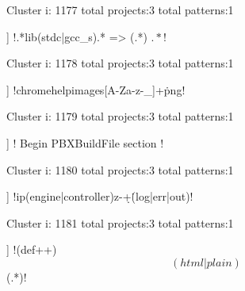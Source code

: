 Cluster i: 1177
total projects:3
total patterns:1
\begin{multicols}{1}
\begin{description}[noitemsep,topsep=0pt]
\item [[3] ] \cverb!.*lib(stdc\+\+|gcc_s).* => (.*) \(.*\)!
\end{description}
\end{multicols}







Cluster i: 1178
total projects:3
total patterns:1
\begin{multicols}{1}
\begin{description}[noitemsep,topsep=0pt]
\item [[3] ] \cverb!chrome\/help\/images\/[A-Za-z-_]+\.png!
\end{description}
\end{multicols}







Cluster i: 1179
total projects:3
total patterns:1
\begin{multicols}{1}
\begin{description}[noitemsep,topsep=0pt]
\item [[3] ] \cverb!\/\* Begin PBXBuildFile section \*\/\n!
\end{description}
\end{multicols}







Cluster i: 1180
total projects:3
total patterns:1
\begin{multicols}{1}
\begin{description}[noitemsep,topsep=0pt]
\item [[3] ] \cverb!ip(engine|controller)z-\d+\.(log|err|out)!
\end{description}
\end{multicols}







Cluster i: 1181
total projects:3
total patterns:1
\begin{multicols}{1}
\begin{description}[noitemsep,topsep=0pt]
\item [[3] ] \cverb!(\s*def\s+\w+\s*)\[(html|plain)\](.*)!
\end{description}
\end{multicols}







